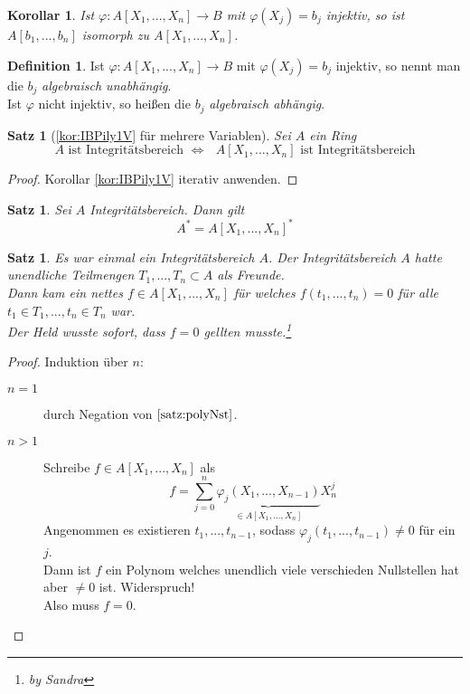 \documentclass[10pt,a4paper]{article}
\theoremstyle{plain}
\newtheorem{kor}[theorem]{Korollar}
\newtheorem{satz}[theorem]{Satz}
\theoremstyle{definition}
\newtheorem{definition}[theorem]{Definition}
\theoremstyle{remark}
\begin{document}
	\begin{kor}
		Ist $\varphi:A[X_1,...,X_n]\to B$ mit $\varphi(X_j)=b_j$ injektiv, so ist $A[b_1,...,b_n]$ isomorph zu $A[X_1,...,X_n]$.
	\end{kor}

	\begin{definition}
		Ist $\varphi:A[X_1,...,X_n]\to B$ mit $\varphi(X_j)=b_j$ injektiv, so nennt man die $b_j$ \emph{algebraisch unabhängig}.\\
		Ist $\varphi$ nicht injektiv, so heißen die $b_j$ \emph{algebraisch abhängig}.
	\end{definition}

	\begin{satz}[\ref{kor:IBPily1V} für mehrere Variablen]
		Sei $A$ ein Ring
		\[\text{$A$ ist Integritätsbereich }\Leftrightarrow\text{ $A[X_1,...,X_n]$ ist Integritätsbereich}\]
	\end{satz}
	\begin{proof}
		Korollar \ref{kor:IBPily1V} iterativ anwenden.
	\end{proof}

	\begin{satz}
		Sei $A$ Integritätsbereich. Dann gilt
		\[A^*=A[X_1,...,X_n]^*\]
	\end{satz}

	\begin{satz}
		Es war einmal ein Integritätsbereich $A$. Der Integritätsbereich $A$ hatte unendliche Teilmengen $T_1,...,T_n\subset A$ als Freunde.\\
		Dann kam ein nettes $f\in A[X_1,...,X_n]$ für welches $f(t_1,...,t_n)=0$ für alle $t_1\in T_1,...,t_n\in T_n$ war.\\
		Der Held wusste sofort, dass $f=0$ gellten musste.\footnote{by Sandra}
	\end{satz}
	\begin{proof}
		Induktion über $n$:
		\begin{description}
			\item[$n=1$] durch Negation von $\ref{satz:polyNst}$.
			\item[$n>1$] Schreibe $f\in A[X_1,...,X_n]$ als
			\[f=\sum_{j=0}^n\underbrace{\varphi_j(X_1,...,X_{n-1})}_{\in A[X_1,...,X_n]}X_n^j\]
			Angenommen es existieren $t_1,...,t_{n-1}$, sodass $\varphi_j(t_1,...,t_{n-1})\neq 0$ für ein $j$.\\
			Dann ist $f$ ein Polynom welches unendlich viele verschieden Nullstellen hat aber $\neq 0$ ist. Widerspruch!\\
			Also muss $f=0$.
		\end{description}
	\end{proof}
\end{document}
